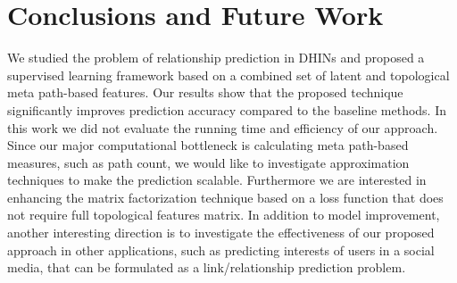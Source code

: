 \section{Conclusions and Future Work}

We studied the problem of relationship prediction in DHINs and proposed a supervised learning framework based on a combined set of latent and topological meta path-based features. Our results show that the proposed technique significantly improves prediction accuracy compared to the baseline methods. In this work we did not evaluate the running time and efficiency of our approach. Since our major computational bottleneck is calculating meta path-based measures, such as path count, we would like to investigate approximation techniques to make the prediction scalable. Furthermore we are interested in enhancing the matrix factorization technique based on a loss function that does not require full topological features matrix. In addition to model improvement, another interesting direction is to investigate the effectiveness of our proposed approach in other applications, such as predicting interests of users in a social media, that can be formulated as a link/relationship prediction problem.